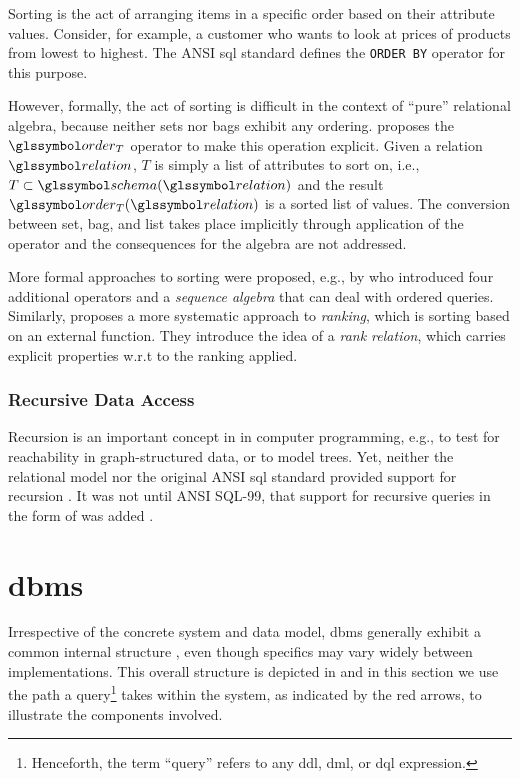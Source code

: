 Sorting is the act of arranging items in a specific order based on their attribute values. Consider, for example, a customer who wants to look at prices of products from lowest to highest. The ANSI \acrshort{sql} standard \cite{XOpen:1996SQL} defines the \texttt{ORDER BY} operator for this purpose.

However, formally, the act of sorting is difficult in the context of ``pure'' relational algebra, because neither sets nor bags exhibit any ordering. \cite{Garcia:2009Database} proposes the $\order_T$ operator to make this operation explicit. Given a relation $\relation$, $T$ is simply a list of attributes to sort on, i.e., $T \subset \schema(\relation)$ and the result $\order_T (\relation)$ is a sorted list of values. The conversion between set, bag, and list takes place implicitly through application of the operator and the consequences for the algebra are not addressed.

More formal approaches to sorting were proposed, e.g., by \cite{Ramakrsihnan:1998SRQL} who introduced four additional operators and a \emph{sequence algebra} that can deal with ordered queries. Similarly, \cite{Chengkai:2005RankSQL} proposes a more systematic approach to \emph{ranking}, which is sorting based on an external function. They introduce the idea of a \emph{rank relation}, which carries explicit properties w.r.t to the ranking applied.

\subsubsection{Recursive Data Access}

Recursion is an important concept in in computer programming, e.g., to test for reachability in graph-structured data, or to model trees. Yet, neither the relational model nor the original ANSI \acrshort{sql} \cite{XOpen:1996SQL} standard provided support for recursion \cite{Libkin:2003Expressive}. It was not until ANSI SQL-99, that support for recursive queries in the form of  was added \cite{Przymus:2010Recursive}.

\section{\texorpdfstring{\acrfull{dbms}}{Database Management System (DBMS)}}
Irrespective of the concrete system and data model, \acrshort{dbms} generally exhibit a common internal structure \cite{Petrov:2019Database,Hellerstein:2007Architecture}, even though specifics may vary widely between implementations. This overall structure is depicted in  and in this section we use the path a query\footnote{Henceforth, the term ``query'' refers to any \acrshort{ddl}, \acrshort{dml}, or \acrshort{dql} expression.} takes within the system, as indicated by the red arrows, to illustrate the components involved.

